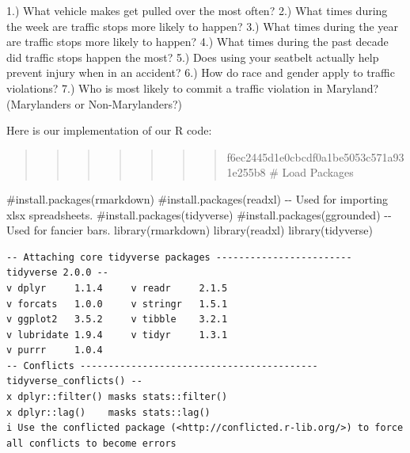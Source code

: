 \documentclass[
  letterpaper,
  DIV=11,
  numbers=noendperiod]{scrartcl}
\newenvironment{Shaded}{\begin{snugshade}}{\end{snugshade}}
\newcommand{\CommentTok}[1]{\textcolor[rgb]{0.37,0.37,0.37}{#1}}
\newcommand{\FunctionTok}[1]{\textcolor[rgb]{0.28,0.35,0.67}{#1}}
\newcommand{\NormalTok}[1]{\textcolor[rgb]{0.00,0.23,0.31}{#1}}
\begin{document}
1.) What vehicle makes get pulled over the most often? 2.) What times
during the week are traffic stops more likely to happen? 3.) What times
during the year are traffic stops more likely to happen? 4.) What times
during the past decade did traffic stops happen the most? 5.) Does using
your seatbelt actually help prevent injury when in an accident? 6.) How
do race and gender apply to traffic violations? 7.) Who is most likely
to commit a traffic violation in Maryland? (Marylanders or
Non-Marylanders?)

Here is our implementation of our R code:

\begin{quote}
\begin{quote}
\begin{quote}
\begin{quote}
\begin{quote}
\begin{quote}
\begin{quote}
f6ec2445d1e0cbcdf0a1be5053c571a931e255b8 \# Load Packages
\end{quote}
\end{quote}
\end{quote}
\end{quote}
\end{quote}
\end{quote}
\end{quote}

\begin{Shaded}
\begin{Highlighting}[]
\CommentTok{\#install.packages(\textquotesingle{}rmarkdown\textquotesingle{})}
\CommentTok{\#install.packages(\textquotesingle{}readxl\textquotesingle{}) {-}{-} Used for importing xlsx spreadsheets.}
\CommentTok{\#install.packages(\textquotesingle{}tidyverse\textquotesingle{})}
\CommentTok{\#install.packages(\textquotesingle{}ggrounded\textquotesingle{}) {-}{-} Used for fancier bars.}
\FunctionTok{library}\NormalTok{(rmarkdown)}
\FunctionTok{library}\NormalTok{(readxl)}
\FunctionTok{library}\NormalTok{(tidyverse)}
\end{Highlighting}
\end{Shaded}

\begin{verbatim}
-- Attaching core tidyverse packages ------------------------ tidyverse 2.0.0 --
v dplyr     1.1.4     v readr     2.1.5
v forcats   1.0.0     v stringr   1.5.1
v ggplot2   3.5.2     v tibble    3.2.1
v lubridate 1.9.4     v tidyr     1.3.1
v purrr     1.0.4     
-- Conflicts ------------------------------------------ tidyverse_conflicts() --
x dplyr::filter() masks stats::filter()
x dplyr::lag()    masks stats::lag()
i Use the conflicted package (<http://conflicted.r-lib.org/>) to force all conflicts to become errors
\end{verbatim}
\end{document}
